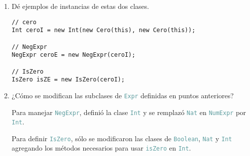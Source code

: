 \documentclass{article}
\newcommand{\tp}[1]{\textcolor{CadetBlue} {\texttt{#1}}}
\begin{document}
\begin{enumerate}
\begin{enumerate}
\begin{itemize}
                \begin{verbatim}
// algunas modificaciones para Booleanos
class Boolean extends Object {
    ...
    /**
    * $p \lor q = False \iff p = q = False = Bool(0) = Bool(0+0)$
    */
    Boolean or(Boolean p) {return new Boolean(this.m.suma(p.m));}

    /**
    * $p \land q = \neg(\neg p \lor \neg q)$
    */
    Boolean and(Boolean p) {return this.not().or(p.not()).not();}
}

// modificaciones para Nat
class Nat extends Object {
    ...
    /**
    * $a = b \iff a \leq b \land b \leq a$
    */
    Nat eq(Nat n) {return this.leq(n).and(n.leq(this));}
    ...
}

// modificacioes para Int
class Int extends Object {
    ...
    Booelan isZero(Int i) {return this.i.eq(this.d);}
    ...
}
                \end{verbatim}

                Y se usa este método para

                \begin{verbatim}
class IsZero extends Expr {
    Expr e;

    isZero(Expr e) {super(); this.e = e;}

    Boolean isAtom() {return (new Booelan(new Nat(this))).false();}

    Expr eval() {return new BoolExpr(e.eval().v.isZero());}
}
                \end{verbatim}
            \end{itemize}

            \item Dé ejemplos de instancias de estas dos clases.

            \begin{verbatim}
// cero
Int ceroI = new Int(new Cero(this), new Cero(this));

// NegExpr
NegExpr ceroE = new NegExpr(ceroI);

// IsZero
IsZero isZE = new IsZero(ceroI);
            \end{verbatim}

            \item ¿Cómo se modifican las subclases de \tp{Expr} definidas en
            puntos anteriores?

            Para manejar \tp{NegExpr}, definió la clase \tp{Int} y se remplazó
            \tp{Nat} en \tp{NumExpr} por \tp{Int}.

            Para definir \tp{IsZero}, sólo se modificaron las clases de
            \tp{Boolean}, \tp{Nat} y \tp{Int} agregando los métodos necesarios
            para usar \tp{isZero} en \tp{Int}.
        \end{enumerate}


\end{enumerate}
\end{document}
